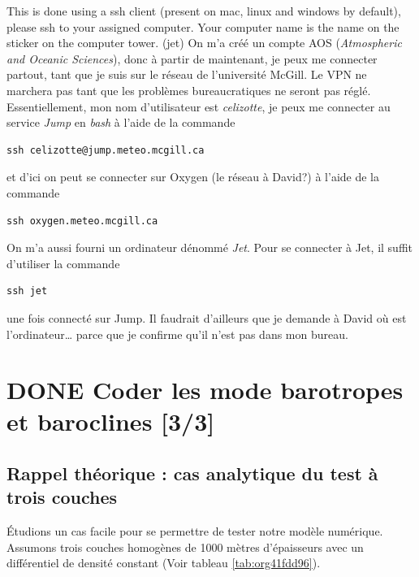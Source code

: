\documentclass[10pt]{article}
\numberwithin{equation}{section}
\begin{document}
This is done using a ssh client (present on mac, linux and windows by default), please ssh to your assigned computer. Your computer name is the name on the sticker on the computer tower. (jet)
On m'a créé un compte AOS (\emph{Atmospheric and Oceanic Sciences}), donc à partir de maintenant, je peux me connecter partout, tant que je suis sur le réseau de l'université McGill.
Le VPN ne marchera pas tant que les problèmes bureaucratiques ne seront pas réglé.\\

Essentiellement, mon nom d'utilisateur est \emph{celizotte}, je peux me connecter au service \emph{Jump} en \emph{bash} à l'aide de la commande
\begin{verbatim}
ssh celizotte@jump.meteo.mcgill.ca
\end{verbatim}
et d'ici on peut se connecter sur Oxygen (le réseau à David?) à l'aide de la commande
\begin{verbatim}
ssh oxygen.meteo.mcgill.ca
\end{verbatim}

On m'a aussi fourni un ordinateur dénommé \emph{Jet}. Pour se connecter à Jet, il suffit d'utiliser la commande
\begin{verbatim}
ssh jet
\end{verbatim}
une fois connecté sur Jump. Il faudrait d'ailleurs que je demande à David où est l'ordinateur\ldots{} parce que je confirme qu'il n'est pas dans mon bureau.
\section{{\bfseries\sffamily DONE} Coder les mode barotropes et baroclines [3/3]}
\label{sec:org6c090ae}
\subsection{Rappel théorique : cas analytique du test à trois couches}
\label{sec:org76b0ba5}
Étudions un cas facile pour se permettre de tester notre modèle numérique.
Assumons trois couches homogènes de 1000 mètres d'épaisseurs avec un différentiel de densité constant (Voir tableau \ref{tab:org41fdd96}).
\end{document}
